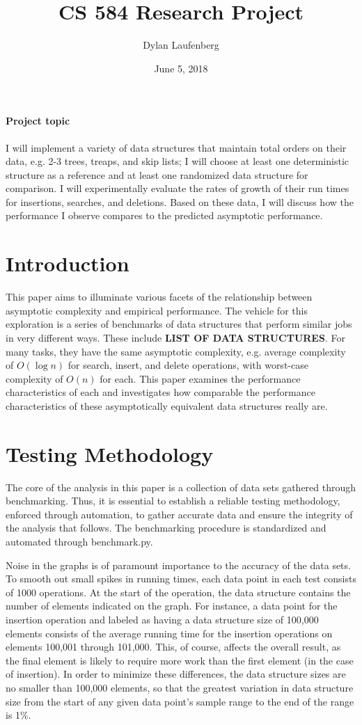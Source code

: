 \documentclass{article}
\title{CS 584 Research Project}
\author{ Dylan Laufenberg }
\date{June 5, 2018}
\newcommand {\todo}[1] {{\textbf{\color{red}#1}}}
\begin{document}
\maketitle

\paragraph{Project topic} I will implement a variety of data structures that maintain total orders on their data, e.g. 2-3 trees, treaps, and skip lists; I will choose at least one deterministic structure as a reference and at least one randomized data structure for comparison. I will experimentally evaluate the rates of growth of their run times for insertions, searches, and deletions. Based on these data, I will discuss how the performance I observe compares to the predicted asymptotic performance.

\newpage
\section{Introduction}
This paper aims to illuminate various facets of the relationship between asymptotic complexity and empirical performance. The vehicle for this exploration is a series of benchmarks of data structures that perform similar jobs in very different ways. These include \todo{LIST OF DATA STRUCTURES}. For many tasks, they have the same asymptotic complexity, e.g. average complexity of $O(\log n)$ for search, insert, and delete operations, with worst-case complexity of $O(n)$ for each. This paper examines the performance characteristics of each and investigates how comparable the performance characteristics of these asymptotically equivalent data structures really are.

\section{Testing Methodology}

The core of the analysis in this paper is a collection of data sets gathered through benchmarking. Thus, it is essential to establish a reliable testing methodology, enforced through automation, to gather accurate data and ensure the integrity of the analysis that follows. The benchmarking procedure is standardized and automated through benchmark.py.

Noise in the graphs is of paramount importance to the accuracy of the data sets. To smooth out small spikes in running times, each data point in each test consists of 1000 operations. At the start of the operation, the data structure contains the number of elements indicated on the graph. For instance, a data point for the insertion operation and labeled as having a data structure size of 100,000 elements consists of the average running time for the insertion operations on elements 100,001 through 101,000. This, of course, affects the overall result, as the final element is likely to require more work than the first element (in the case of insertion). In order to minimize these differences, the data structure sizes are no smaller than 100,000 elements, so that the greatest variation in data structure size from the start of any given data point's sample range to the end of the range is 1\%.
\end{document}
